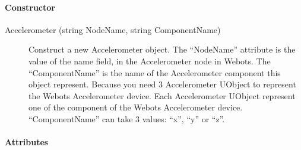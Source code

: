 \paragraph{Constructor}
\label{webots.uobjects.robotdevices.accelerometer.constructor}%

\noindent
\begin{description}
\item[{Accelerometer (string NodeName, string ComponentName)}]
  Construct a new Accelerometer object.  The ``NodeName'' attribute is
  the value of the name field, in the Accelerometer node in Webots.
  The ``ComponentName'' is the name of the Accelerometer component this
  object represent.  Because you need 3 Accelerometer UObject to
  represent the Webots Accelerometer device. Each Accelerometer
  UObject represent one of the component of the Webots Accelerometer
  device.  ``ComponentName'' can take 3 values: ``x'', ``y'' or ``z''.

\end{description}

\paragraph{Attributes}
\label{webots.uobjects.robotdevices.accelerometer.attributes}%


